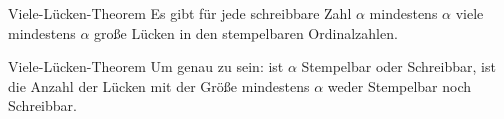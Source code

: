 \begin{frame}[c]{Viele-Lücken-Theorem}
    \Large
    Es gibt für jede schreibbare Zahl $\alpha$ mindestens $\alpha$ viele
    mindestens $\alpha$ große Lücken in den stempelbaren Ordinalzahlen.
\end{frame}


\begin{frame}[c]{Viele-Lücken-Theorem}
    \Large
    Um genau zu sein: ist $\alpha$ Stempelbar oder Schreibbar, ist die Anzahl
    der Lücken mit der Größe mindestens $\alpha$ weder Stempelbar noch
    Schreibbar.
\end{frame}





